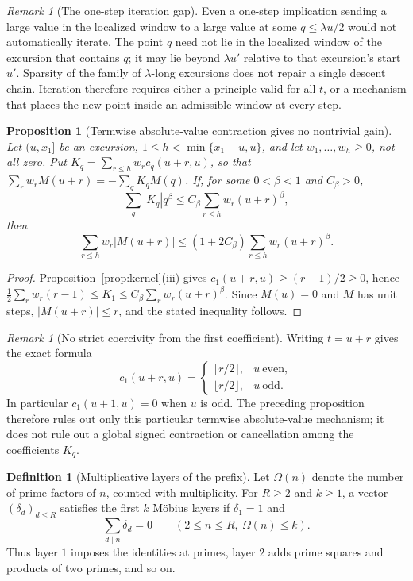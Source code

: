 \documentclass[11pt]{amsart}
\numberwithin{equation}{section}
\theoremstyle{plain}
\newtheorem{proposition}[theorem]{Proposition}
\theoremstyle{definition}
\newtheorem{definition}[theorem]{Definition}
\theoremstyle{remark}
\newtheorem{remark}[theorem]{Remark}
\begin{document}
\begin{remark}[The one-step iteration gap]
\label{rem:iteration-gap}
Even a one-step implication sending a large value in the localized window
to a large value at some $q\le\lambda u/2$ would not automatically iterate.
The point $q$ need not lie in the localized window of the excursion that
contains $q$; it may lie beyond $\lambda u'$ relative to that excursion's
start $u'$.  Sparsity of the family of $\lambda$-long excursions does not
repair a single descent chain.  Iteration therefore requires either a
principle valid for all $t$, or a mechanism that places the new point inside
an admissible window at every step.
\end{remark}

\begin{proposition}[Termwise absolute-value contraction gives no nontrivial gain]
\label{prop:cone-obstruction}
Let $(u,x_1]$ be an excursion, $1\le h<\min\{x_1-u,u\}$, and let
$w_1,\dots,w_h\ge0$, not all zero. Put
$K_q=\sum_{r\le h}w_rc_q(u+r,u)$, so that
$\sum_rw_rM(u+r)=-\sum_qK_qM(q)$. If, for some $0<\beta<1$ and
$C_\beta>0$,
\[
\sum_q|K_q|q^\beta\le C_\beta\sum_{r\le h}w_r(u+r)^\beta,
\]
then
\[
\sum_{r\le h}w_r|M(u+r)|
\le(1+2C_\beta)\sum_{r\le h}w_r(u+r)^\beta.
\]
\end{proposition}

\begin{proof}
Proposition~\ref{prop:kernel}(iii) gives
$c_1(u+r,u)\ge(r-1)/2\ge0$, hence
$\frac12\sum_rw_r(r-1)\le K_1\le
C_\beta\sum_rw_r(u+r)^\beta$. Since $M(u)=0$ and $M$ has unit steps,
$|M(u+r)|\le r$, and the stated inequality follows.
\end{proof}

\begin{remark}[No strict coercivity from the first coefficient]
\label{rem:c1-parity}
Writing $t=u+r$ gives the exact formula
\[
c_1(u+r,u)=
\begin{cases}
\lceil r/2\rceil,&u\ \text{even},\\
\lfloor r/2\rfloor,&u\ \text{odd}.
\end{cases}
\]
In particular $c_1(u+1,u)=0$ when $u$ is odd.  The preceding proposition
therefore rules out only this particular termwise absolute-value mechanism;
it does not rule out a global signed contraction or cancellation among the
coefficients $K_q$.
\end{remark}

\begin{definition}[Multiplicative layers of the prefix]
\label{def:multiplicative-layers}
Let $\Omega(n)$ denote the number of prime factors of $n$, counted with
multiplicity.  For $R\ge2$ and $k\ge1$, a vector
$(\delta_d)_{d\le R}$ satisfies the first $k$ M\"obius layers if
$\delta_1=1$ and
\[
\sum_{d\mid n}\delta_d=0
\qquad(2\le n\le R,\ \Omega(n)\le k).
\]
Thus layer $1$ imposes the identities at primes, layer $2$ adds prime
squares and products of two primes, and so on.
\end{definition}
\end{document}
